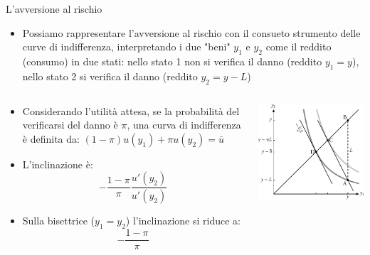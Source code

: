 \documentclass[aspectratio=149,11pt]{beamer}
\begin{document}
\begin{frame}{L'avversione al rischio}
\begin{itemize}
\item Possiamo rappresentare l'avversione al rischio con il consueto strumento
delle curve di indifferenza, interpretando i due "beni" \(y_1\) e \(y_2\) come
il reddito (consumo) in due stati: nello stato 1 non si verifica il danno
(reddito \(y_1=y\)), nello stato 2 si verifica il danno (reddito \(y_2=y-L\))
\end{itemize}
\begin{columns}
\begin{column}{.5\columnwidth}
\begin{itemize}
\item Considerando l'utilità attesa, se la probabilità del verificarsi del
danno è \(\pi\), una curva di indifferenza è definita da: \((1-\pi)u(y_1)+\pi
  u(y_2)=\bar u\)
\item L'inclinazione è:
$$ -\frac{1-\pi}{\pi}\frac{u'(y_2)}{u'(y_2)} $$
\item Sulla
bisettrice (\(y_1=y_2\)) l'inclinazione si riduce a: $$ -\frac{1-\pi}{\pi} $$
\end{itemize}
\end{column}
\begin{column}{.5\columnwidth}
\begin{center}
\includegraphics[width=.9\textwidth]{./figure/rischio-1.pdf}
\end{center}
\end{column}
\end{columns}
\end{frame}
\end{document}
